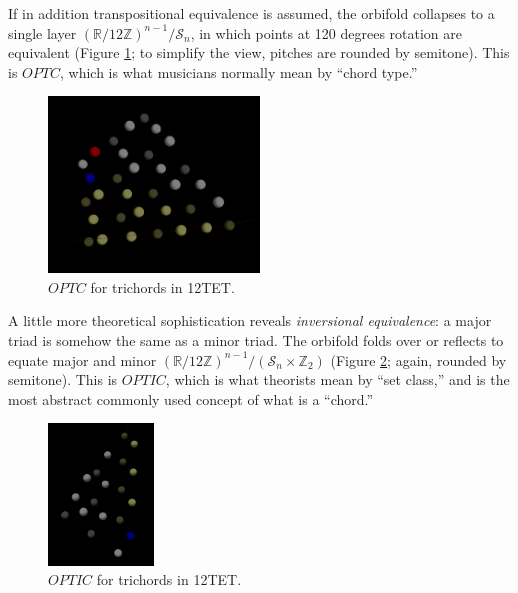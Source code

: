 \documentclass[english,11pt,letterpaper,onecolumn]{scrartcl}
\numberwithin{equation}{section}
\begin{document}
If in addition transpositional equivalence is assumed, the orbifold collapses to
a single layer $\left(\mathbb{R}/12\mathbb{Z}\right)^{n-1}/\mathcal{S}_{n}$, in
which points at 120 degrees rotation are equivalent (Figure \ref{fig:opttc}; to
simplify the view, pitches are rounded by semitone). This is $OPTC$, which is
what musicians normally mean by ``chord type.''
\begin{figure}
\centerline{\includegraphics[width = 0.5\textwidth]{opttc}}
\caption{\label{fig:opttc}
  $OPTC$ for trichords in 12TET.}
\end{figure}

A little more theoretical sophistication reveals \textit{inversional
equivalence}: a major triad is somehow the same as a minor triad. The orbifold
folds over or reflects to equate major and minor
$\left(\mathbb{R}/12\mathbb{Z}\right)^{n-1}/(\mathcal{S}_{n} \times
\mathbb{Z}_{2})$ (Figure \ref{fig:optic}; again, rounded by semitone). This is
$OPTIC$, which is what theorists mean by ``set class,'' and is the most abstract
commonly used concept of what is a ``chord.''
\begin{figure}
\centerline{\includegraphics[width = 0.25\textwidth]{opttic}}
\caption{\label{fig:optic}
$OPTIC$ for trichords in 12TET.}
\end{figure}
\end{document}
